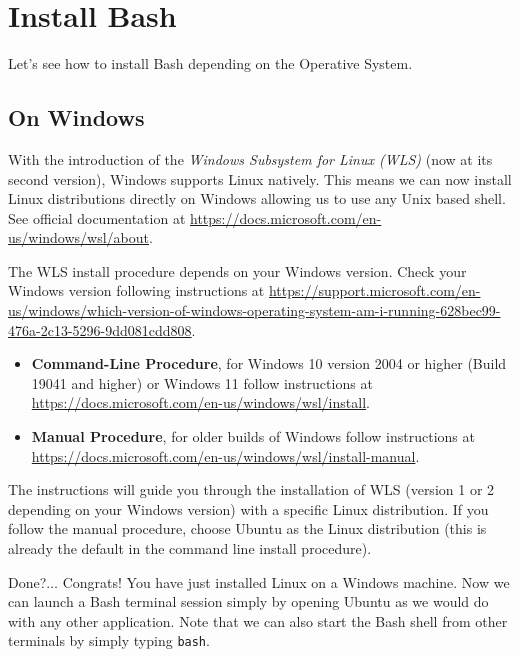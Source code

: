 \documentclass[
  11pt,
]{book}
\providecommand{\tightlist}{%
  \setlength{\itemsep}{0pt}\setlength{\parskip}{0pt}}
\begin{document}
\hypertarget{install-bash}{%
\section{Install Bash}\label{install-bash}}

Let's see how to install Bash depending on the Operative System.

\hypertarget{install-windows-terminal}{%
\subsection{On Windows}\label{install-windows-terminal}}

With the introduction of the \emph{Windows Subsystem for Linux (WLS)} (now at its second version), Windows supports Linux natively. This means we can now install Linux distributions directly on Windows allowing us to use any Unix based shell. See official documentation at \url{https://docs.microsoft.com/en-us/windows/wsl/about}.

The WLS install procedure depends on your Windows version. Check your Windows version following instructions at \url{https://support.microsoft.com/en-us/windows/which-version-of-windows-operating-system-am-i-running-628bec99-476a-2c13-5296-9dd081cdd808}.

\begin{itemize}
\tightlist
\item
  \textbf{Command-Line Procedure}, for Windows 10 version 2004 or higher (Build 19041 and higher) or Windows 11 follow instructions at \url{https://docs.microsoft.com/en-us/windows/wsl/install}.
\item
  \textbf{Manual Procedure}, for older builds of Windows follow instructions at \url{https://docs.microsoft.com/en-us/windows/wsl/install-manual}.
\end{itemize}

The instructions will guide you through the installation of WLS (version 1 or 2 depending on your Windows version) with a specific Linux distribution. If you follow the manual procedure, choose Ubuntu as the Linux distribution (this is already the default in the command line install procedure).

Done?\(\ldots\) Congrats! You have just installed Linux on a Windows machine. Now we can launch a Bash terminal session simply by opening Ubuntu as we would do with any other application. Note that we can also start the Bash shell from other terminals by simply typing \texttt{bash}.
\end{document}
